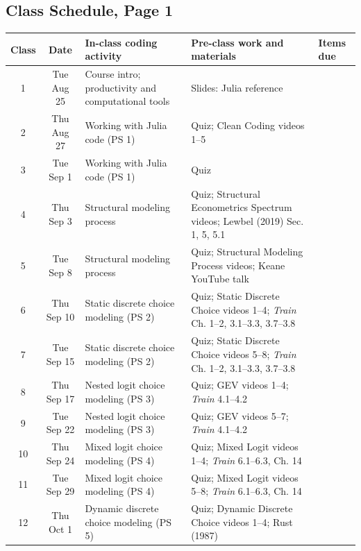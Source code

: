 \documentclass[11pt,english]{article}
\begin{document}
\begin{landscape}
\section*{Class Schedule, Page 1}
\begin{center}
\begin{tabular}{cc>{\raggedright}m{5.5cm}>{\raggedright}m{7.5cm}>{\raggedright}m{3.5cm}}
\toprule
\textbf{Class} & \textbf{Date} & \textbf{In-class coding activity} & \textbf{Pre-class work and materials} & \textbf{Items due} \tabularnewline \midrule
1  & Tue Aug 25 & Course intro; productivity and computational tools & Slides: Julia reference                                                            &  \tabularnewline
2  & Thu Aug 27 & Working with Julia code (PS 1)                      & Quiz; Clean Coding videos 1--5                                                     &  \tabularnewline
3  & Tue Sep 1  & Working with Julia code (PS 1)                      & Quiz                                                     &  \tabularnewline
4  & Thu Sep 3  & Structural modeling process                         & Quiz; Structural Econometrics Spectrum videos; Lewbel (2019) Sec. 1, 5, 5.1        &  \tabularnewline
5  & Tue Sep 8  & Structural modeling process                         & Quiz; Structural Modeling Process videos; Keane YouTube talk                       &  \tabularnewline
6  & Thu Sep 10 & Static discrete choice modeling (PS 2)              & Quiz; Static Discrete Choice videos 1--4; \emph{Train} Ch. 1--2, 3.1--3.3, 3.7--3.8 &  \tabularnewline
7  & Tue Sep 15 & Static discrete choice modeling (PS 2)              & Quiz; Static Discrete Choice videos 5--8; \emph{Train} Ch. 1--2, 3.1--3.3, 3.7--3.8 &  \tabularnewline
8  & Thu Sep 17 & Nested logit choice modeling (PS 3)                 & Quiz; GEV videos 1--4; \emph{Train} 4.1--4.2                                       &  \tabularnewline
9  & Tue Sep 22 & Nested logit choice modeling (PS 3)                 & Quiz; GEV videos 5--7; \emph{Train} 4.1--4.2                                       &  \tabularnewline
10 & Thu Sep 24 & Mixed logit choice modeling (PS 4)                  & Quiz; Mixed Logit videos 1--4; \emph{Train} 6.1--6.3, Ch. 14                       &  \tabularnewline
11 & Tue Sep 29 & Mixed logit choice modeling (PS 4)                  & Quiz; Mixed Logit videos 5--8; \emph{Train} 6.1--6.3, Ch. 14                       &  \tabularnewline
12 & Thu Oct 1  & Dynamic discrete choice modeling (PS 5)             & Quiz; Dynamic Discrete Choice videos 1--4; Rust (1987)                             &  \tabularnewline

\end{tabular}
\end{center}
\end{landscape}
\end{document}
